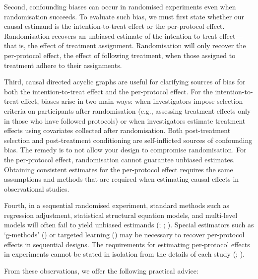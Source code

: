 \documentclass[
  single column]{article}
\begin{document}
Second, confounding biases can occur in randomised experiments even when
randomisation succeeds. To evaluate such bias, we must first state
whether our causal estimand is the intention-to-treat effect or the
per-protocol effect. Randomisation recovers an unbiased estimate of the
intention-to-treat effect---that is, the effect of treatment assignment.
Randomisation will only recover the per-protocol effect, the effect of
following treatment, when those assigned to treatment adhere to their
assignments.

Third, causal directed acyclic graphs are useful for clarifying sources
of bias for both the intention-to-treat effect and the per-protocol
effect. For the intention-to-treat effect, biases arise in two main
ways: when investigators impose selection criteria on participants after
randomisation (e.g., assessing treatment effects only in those who have
followed protocols) or when investigators estimate treatment effects
using covariates collected after randomisation. Both post-treatment
selection and post-treatment conditioning are self-inflicted sources of
confounding bias. The remedy is to not allow your design to compromise
randomisation. For the per-protocol effect, randomisation cannot
guarantee unbiased estimates. Obtaining consistent estimates for the
per-protocol effect requires the same assumptions and methods that are
required when estimating causal effects in observational studies.

Fourth, in a sequential randomised experiment, standard methods such as
regression adjustment, statistical structural equation models, and
multi-level models will often fail to yield unbiased estimands
(;
;
).
Special estimators such as `g-methods'
() or targeted
learning () may
be necessary to recover per-protocol effects in sequential designs. The
requirements for estimating per-protocol effects in experiments cannot
be stated in isolation from the details of each study
(;
).

From these observations, we offer the following practical advice:
\end{document}
